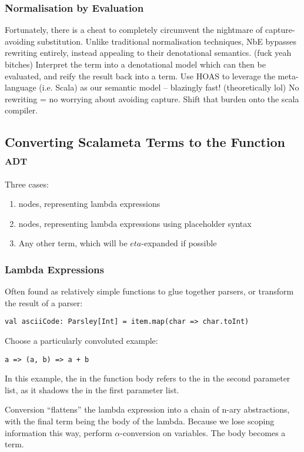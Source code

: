 \documentclass[../../main.tex]{subfiles}
\begin{document}
\subsubsection{Normalisation by Evaluation}
Fortunately, there is a cheat to completely circumvent the nightmare of capture-avoiding substitution.
Unlike traditional normalisation techniques, NbE bypasses rewriting entirely, instead appealing to their denotational semantics. (fuck yeah bitches)
Interpret the term into a denotational model which can then be evaluated, and reify the result back into a term.
Use HOAS to leverage the meta-language (i.e. Scala) as our semantic model -- blazingly fast! (theoretically lol)
No rewriting = no worrying about avoiding capture.
Shift that burden onto the scala compiler.


\subsection{Converting Scalameta Terms to the Function \textsc{adt}}
Three cases:
\begin{enumerate}
    \item {} nodes, representing lambda expressions
    \item {} nodes, representing lambda expressions using placeholder syntax
    \item Any other term, which will be $eta$-expanded if possible
\end{enumerate}

\subsubsection{Lambda Expressions}
Often found as relatively simple functions to glue together parsers, or transform the result of a parser:
\begin{verbatim}
val asciiCode: Parsley[Int] = item.map(char => char.toInt)
\end{verbatim}

Choose a particularly convoluted example:
\begin{verbatim}
a => (a, b) => a + b
\end{verbatim}
In this example, the  in the function body refers to the  in the second parameter list, as it shadows the  in the first parameter list.

Conversion ``flattens'' the lambda expression into a chain of n-ary abstractions, with the final term being the body of the lambda.
Because we lose scoping information this way, perform $\alpha$-conversion on variables.
The body becomes a  term.
\end{document}
